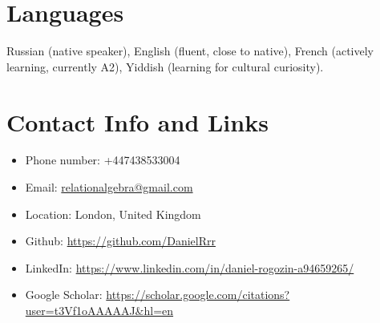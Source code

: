 \documentclass[10pt,a4paper]{article}
\begin{document}
\section{Languages}
Russian (native speaker), English (fluent, close to native), French (actively learning, currently A2), Yiddish (learning for cultural curiosity).
\section{Contact Info and Links}

\begin{itemize}[leftmargin=*]
    \item Phone number: +447438533004
    \item Email: \href{mailto:relationalgebra@gmail.com}{relationalgebra@gmail.com}
    \item Location: London, United Kingdom
    \item Github: \url{https://github.com/DanielRrr}
    \item LinkedIn: \url{https://www.linkedin.com/in/daniel-rogozin-a94659265/}
    \item Google Scholar: \url{https://scholar.google.com/citations?user=t3Vf1oAAAAAJ&hl=en}
\end{itemize}
\end{document}

